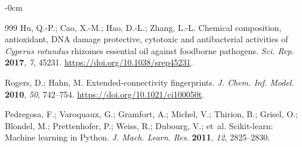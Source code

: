 \documentclass[applsci,article,submit,oneauthor]{Definitions/mdpi}
\begin{document}
\begin{adjustwidth}{-\extralength}{0cm}
\begin{thebibliography}{999}
 Hu, Q.-P.; Cao, X.-M.; Hao, D.-L.; Zhang, L.-L. Chemical composition, antioxidant, DNA damage protective, cytotoxic and antibacterial activities of \emph{Cyperus rotundus} rhizomes essential oil against foodborne pathogens. \emph{Sci. Rep.} \textbf{2017}, \emph{7}, 45231. \url{https://doi.org/10.1038/srep45231}.

 Rogers, D.; Hahn, M. Extended-connectivity fingerprints. \emph{J. Chem. Inf. Model.} \textbf{2010}, \emph{50}, 742--754. \url{https://doi.org/10.1021/ci100050t}.

 Pedregosa, F.; Varoquaux, G.; Gramfort, A.; Michel, V.; Thirion, B.; Grisel, O.; Blondel, M.; Prettenhofer, P.; Weiss, R.; Dubourg, V.; et~al. Scikit-learn: Machine learning in Python. \emph{J. Mach. Learn. Res.} \textbf{2011}, \emph{12}, 2825--2830.

\end{thebibliography}

\PublishersNote{}
\end{adjustwidth}
\end{document}
